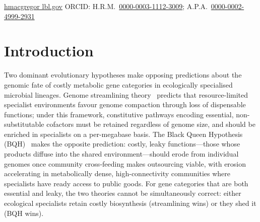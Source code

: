 \documentclass[times]{zHenriquesLab-StyleBioRxiv}
\begin{document}
\begin{corrauthor}
\href{mailto:hmacgregor@lbl.gov}{hmacgregor \at lbl.gov}\quad
ORCID: H.R.M.~\href{https://orcid.org/0000-0003-1112-3009}{0000-0003-1112-3009};\enspace
A.P.A.~\href{https://orcid.org/0000-0002-4999-2931}{0000-0002-4999-2931}
\end{corrauthor}


\section*{Introduction}
\setcounter{section}{1}

Two dominant evolutionary hypotheses make opposing predictions about the
genomic fate of costly metabolic gene categories in ecologically specialised
microbial lineages. Genome streamlining theory~\cite{giovannoni2014} predicts
that resource-limited specialist environments favour genome compaction through
loss of dispensable functions; under this framework, constitutive pathways
encoding essential, non-substitutable cofactors must be retained regardless of
genome size, and should be enriched in specialists on a per-megabase basis.
The Black Queen Hypothesis (BQH)~\cite{morris2012} makes the opposite
prediction: costly, leaky functions---those whose products diffuse into the
shared environment---should erode from individual genomes once community
cross-feeding makes outsourcing viable, with erosion accelerating in
metabolically dense, high-connectivity communities where specialists have
ready access to public goods. For gene categories that are both essential and
leaky, the two theories cannot be simultaneously correct: either ecological
specialists retain costly biosynthesis (streamlining wins) or they shed it
(BQH wins).
\end{document}
